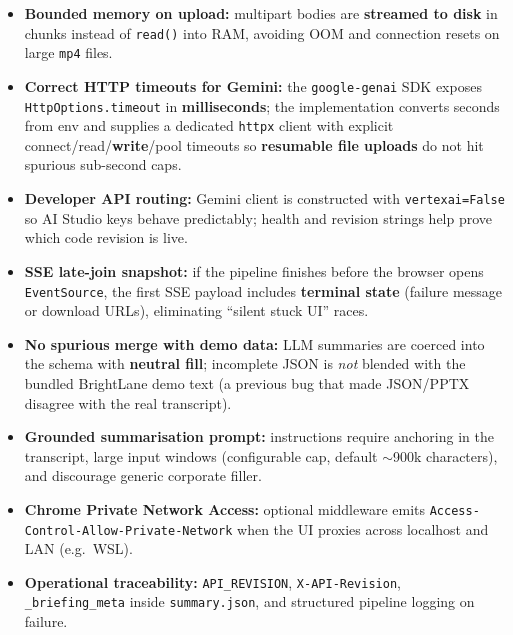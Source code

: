 \documentclass[11pt,a4paper]{article}
\begin{document}
\begin{tcolorbox}[title=\textbf{Resilience checklist},colframe=BrandTeal!70]
  \begin{itemize}[leftmargin=*]
    \item \textbf{Bounded memory on upload:} multipart bodies are \textbf{streamed to disk} in chunks instead of \texttt{read()} into RAM, avoiding OOM and connection resets on large \texttt{mp4} files.
    \item \textbf{Correct HTTP timeouts for Gemini:} the \texttt{google-genai} SDK exposes \texttt{HttpOptions.timeout} in \textbf{milliseconds}; the implementation converts seconds from env and supplies a dedicated \texttt{httpx} client with explicit connect/read/\textbf{write}/pool timeouts so \textbf{resumable file uploads} do not hit spurious sub-second caps.
    \item \textbf{Developer API routing:} Gemini client is constructed with \texttt{vertexai=False} so AI Studio keys behave predictably; health and revision strings help prove which code revision is live.
    \item \textbf{SSE late-join snapshot:} if the pipeline finishes before the browser opens \texttt{EventSource}, the first SSE payload includes \textbf{terminal state} (failure message or download URLs), eliminating ``silent stuck UI'' races.
    \item \textbf{No spurious merge with demo data:} LLM summaries are coerced into the schema with \textbf{neutral fill}; incomplete JSON is \emph{not} blended with the bundled BrightLane demo text (a previous bug that made JSON/PPTX disagree with the real transcript).
    \item \textbf{Grounded summarisation prompt:} instructions require anchoring in the transcript, large input windows (configurable cap, default $\sim$900k characters), and discourage generic corporate filler.
    \item \textbf{Chrome Private Network Access:} optional middleware emits \texttt{Access-Control-Allow-Private-Network} when the UI proxies across localhost and LAN (e.g.\ WSL).
    \item \textbf{Operational traceability:} \texttt{API\_REVISION}, \texttt{X-API-Revision}, \texttt{\_briefing\_meta} inside \texttt{summary.json}, and structured pipeline logging on failure.
  \end{itemize}
\end{tcolorbox}
\end{document}
